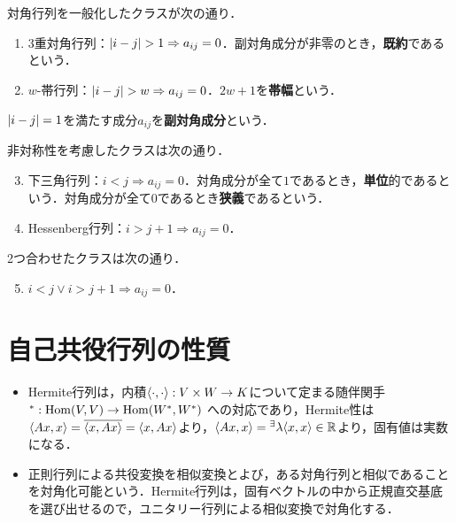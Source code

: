 \documentclass[uplatex, dvipdfmx]{jsreport}
\begin{document}
\begin{definition}
    対角行列を一般化したクラスが次の通り．
    \begin{enumerate}
        \item 3重対角行列：$\lvert i-j\rvert>1\Rightarrow a_{ij}=0$．副対角成分が非零のとき，\textbf{既約}であるという．
        \item $w$-帯行列：$\lvert i-j\rvert>w\Rightarrow a_{ij}=0$．$2w+1$を\textbf{帯幅}という．
    \end{enumerate}
    $\lvert i-j\rvert=1$を満たす成分$a_{ij}$を\textbf{副対角成分}という．

    非対称性を考慮したクラスは次の通り．
    \begin{enumerate}\setcounter{enumi}{2}
        \item 下三角行列：$i<j\Rightarrow a_{ij}=0$．対角成分が全て$1$であるとき，\textbf{単位}的であるという．対角成分が全て$0$であるとき\textbf{狭義}であるという．
        \item Hessenberg行列：$i>j+1\Rightarrow a_{ij}=0$．
    \end{enumerate}
    2つ合わせたクラスは次の通り．
    \begin{enumerate}\setcounter{enumi}{4}
        \item $i<j\lor i>j+1\Rightarrow a_{ij}=0$．
    \end{enumerate}
\end{definition}

\section{自己共役行列の性質}

\begin{tcolorbox}[colframe=ForestGreen, colback=ForestGreen!10!white,breakable,colbacktitle=ForestGreen!40!white,coltitle=black,fonttitle=\bfseries\sffamily,
title=]
    \begin{itemize}
        \item Hermite行列は，内積$\langle\cdot,\cdot\rangle:V\times W\to K$について定まる随伴関手${}^*:\mathrm{Hom}(V,V)\to\mathrm{Hom}(W^*,W^*)$
        への対応であり，Hermite性は$\langle Ax,x\rangle=\overline{\langle x,Ax\rangle}=\langle x,Ax\rangle$より，$\langle Ax,x\rangle={}^\exists\lambda\langle x,x\rangle\in\mathbb{R}$より，固有値は実数になる．
        \item 正則行列による共役変換を相似変換とよび，ある対角行列と相似であることを対角化可能という．Hermite行列は，固有ベクトルの中から正規直交基底を選び出せるので，ユニタリー行列による相似変換で対角化する．
    \end{itemize}
\end{tcolorbox}
\end{document}
